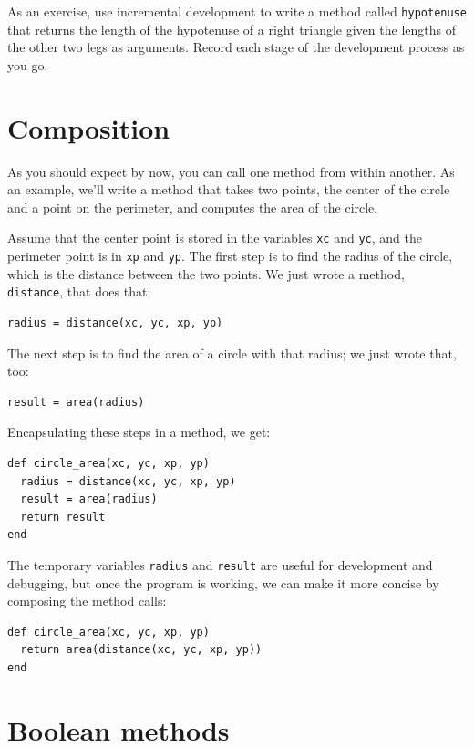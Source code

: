 \documentclass[10pt]{book}
\begin{document}
As an exercise, use incremental development to write a method
called {\tt hypotenuse} that returns the length of the hypotenuse of a
right triangle given the lengths of the other two legs as arguments.
Record each stage of the development process as you go.



\section{Composition}

As you should expect by now, you can call one method from within
another.  As an example, we'll write a method that takes two points,
the center of the circle and a point on the perimeter, and computes
the area of the circle.

Assume that the center point is stored in the variables {\tt xc} and
{\tt yc}, and the perimeter point is in {\tt xp} and {\tt yp}. The
first step is to find the radius of the circle, which is the distance
between the two points.  We just wrote a method, {\tt
distance}, that does that:

\begin{verbatim}
radius = distance(xc, yc, xp, yp)
\end{verbatim}
%
The next step is to find the area of a circle with that radius;
we just wrote that, too:

\begin{verbatim}
result = area(radius)
\end{verbatim}
%
Encapsulating these steps in a method, we get:

\begin{verbatim}
def circle_area(xc, yc, xp, yp)
  radius = distance(xc, yc, xp, yp)
  result = area(radius)
  return result
end
\end{verbatim}
%
The temporary variables {\tt radius} and {\tt result} are useful for
development and debugging, but once the program is working, we can
make it more concise by composing the method calls:

\begin{verbatim}
def circle_area(xc, yc, xp, yp)
  return area(distance(xc, yc, xp, yp))
end
\end{verbatim}
%

\section{Boolean methods}
\label{boolean}
\end{document}
